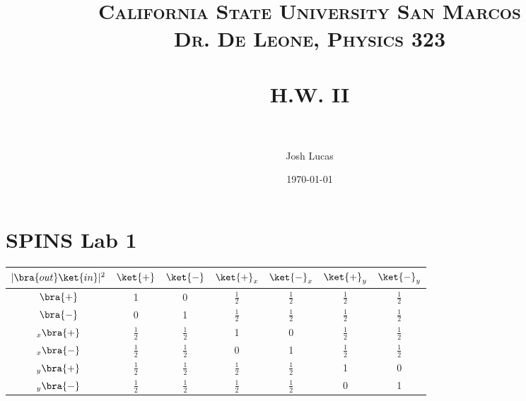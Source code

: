 \documentclass[paper=a4, fontsize=11pt]{scrartcl} %
\title{	
\normalfont \normalsize 
\textsc{California State University San Marcos \\ Dr. De Leone, Physics 323} \\ [25pt] %
\horrule{0.5pt} \\[0.4cm] %
\huge H.W. II \\ %
\horrule{2pt} \\[0.5cm] %
}
\author{Josh Lucas} %
\date{\normalsize\today} %
\numberwithin{equation}{section} %
\numberwithin{figure}{section} %
\numberwithin{table}{section} %
\begin{document}
\maketitle %


\section{SPINS Lab 1}
\renewcommand{\arraystretch}{2}
\begin{center}
  \begin{tabular}{ | c | c | c | c | c | c | c | }
    \hline
    $|\bra{out}\ket{in}|^2$ & $\ket{+}$& $\ket{-}$ & $\ket{+}_x$ & $\ket{-}_x$ & $\ket{+}_y$ & $\ket{-}_y$ \\ \hline
  $  \bra{+}$ & 1 &0   & $\tfrac{1}{2}$ & $\tfrac{1}{2}$  & $\tfrac{1}{2}$ & $\tfrac{1}{2}$   \\ \hline
    $\bra{-}$ & 0 & 1 & $\tfrac{1}{2}$ &$\tfrac{1}{2}$  & $\tfrac{1}{2}$ &  $\tfrac{1}{2}$ \\
    \hline
       $_x\bra{+}$ & $\tfrac{1}{2}$ & $\tfrac{1}{2}$ & 1 & 0 & $\tfrac{1}{2}$ & $\tfrac{1}{2}$  \\
    \hline
       $_x\bra{-}$ & $\tfrac{1}{2}$ & $\tfrac{1}{2}$ & 0 & 1 &$\tfrac{1}{2}$  & $\tfrac{1}{2}$  \\
    \hline
       $_y\bra{+}$ & $\tfrac{1}{2}$ &$\tfrac{1}{2}$  &$\tfrac{1}{2}$  &$\tfrac{1}{2}$  & 1 &  0 \\
    \hline
       $_y\bra{-}$ &$\tfrac{1}{2}$  &$\tfrac{1}{2}$  & $\tfrac{1}{2}$ & $\tfrac{1}{2}$ & 0 & 1  \\
    \hline
  \end{tabular}
\end{center}
\end{document}
